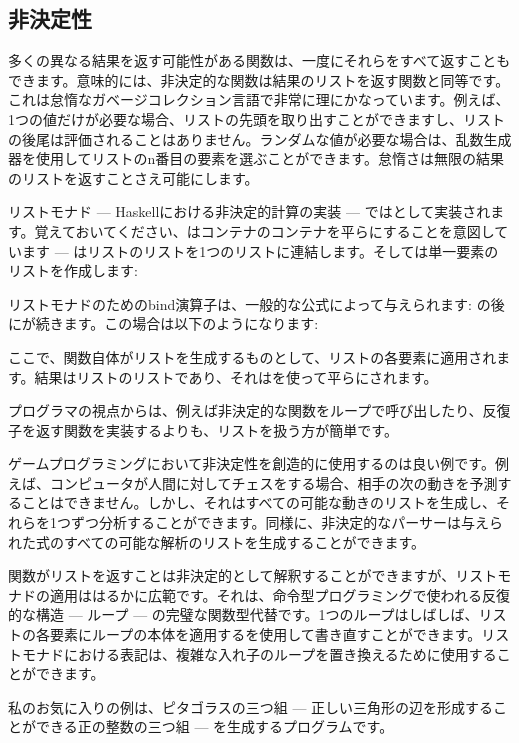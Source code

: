 \subsection{非決定性}

多くの異なる結果を返す可能性がある関数は、一度にそれらをすべて返すこともできます。意味的には、非決定的な関数は結果のリストを返す関数と同等です。これは怠惰なガベージコレクション言語で非常に理にかなっています。例えば、1つの値だけが必要な場合、リストの先頭を取り出すことができますし、リストの後尾は評価されることはありません。ランダムな値が必要な場合は、乱数生成器を使用してリストのn番目の要素を選ぶことができます。怠惰さは無限の結果のリストを返すことさえ可能にします。

リストモナド --- Haskellにおける非決定的計算の実装 --- ではとして実装されます。覚えておいてください、はコンテナのコンテナを平らにすることを意図しています --- はリストのリストを1つのリストに連結します。そしては単一要素のリストを作成します: 

リストモナドのためのbind演算子は、一般的な公式によって与えられます: 
の後にが続きます。この場合は以下のようになります: 

ここで、関数自体がリストを生成するものとして、リストの各要素に適用されます。結果はリストのリストであり、それはを使って平らにされます。

プログラマの視点からは、例えば非決定的な関数をループで呼び出したり、反復子を返す関数を実装するよりも、リストを扱う方が簡単です。

ゲームプログラミングにおいて非決定性を創造的に使用するのは良い例です。例えば、コンピュータが人間に対してチェスをする場合、相手の次の動きを予測することはできません。しかし、それはすべての可能な動きのリストを生成し、それらを1つずつ分析することができます。同様に、非決定的なパーサーは与えられた式のすべての可能な解析のリストを生成することができます。

関数がリストを返すことは非決定的として解釈することができますが、リストモナドの適用ははるかに広範です。それは、命令型プログラミングで使われる反復的な構造 --- ループ --- の完璧な関数型代替です。1つのループはしばしば、リストの各要素にループの本体を適用するを使用して書き直すことができます。リストモナドにおける表記は、複雑な入れ子のループを置き換えるために使用することができます。

私のお気に入りの例は、ピタゴラスの三つ組 --- 正しい三角形の辺を形成することができる正の整数の三つ組 --- を生成するプログラムです。

